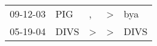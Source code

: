 \begin{supertabular}{lllll}
 09-12-03 &   PIG &             , &  \textgreater &   bya \\
 05-19-04 &  DIVS &  \textgreater &  \textgreater &  DIVS \\
\end{supertabular}
